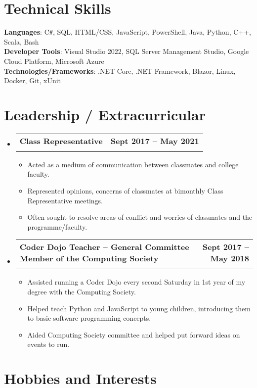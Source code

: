 \documentclass[letterpaper,11pt]{article}
\makeatletter
\newcommand{\resumeItem}[1]{
  \item\small{
    {#1 \vspace{-2pt}}
  }
}
\newcommand{\resumeSubheading}[4]{
  \vspace{-2pt}\item
    \begin{tabular*}{1.0\textwidth}[t]{l@{\extracolsep{\fill}}r}
      \textbf{#1} & \textbf{\small #2} \\
      \textit{\small#3} & \textit{\small #4} \\
    \end{tabular*}\vspace{-7pt}
}
\newcommand{\resumeSubHeadingListStart}{\begin{itemize}[leftmargin=0.0in, label={}]}
\newcommand{\resumeSubHeadingListEnd}{\end{itemize}}
\newcommand{\resumeItemListStart}{\begin{itemize}}
\newcommand{\resumeItemListEnd}{\end{itemize}\vspace{-5pt}}
\makeatother
\begin{document}
%
\section{Technical Skills}
\begin{itemize}[leftmargin=0.15in, label={}]
	\small{\item{
		\textbf{Languages}{: C\verb|#|, SQL, HTML/CSS, JavaScript, PowerShell, Java, Python, C++, Scala, Bash} \\
		\textbf{Developer Tools}{: Visual Studio 2022, SQL Server Management Studio, Google Cloud Platform, Microsoft Azure} \\
		\textbf{Technologies/Frameworks}{: .NET Core, .NET Framework, Blazor, Linux, Docker, Git, xUnit} \\
	}}
\end{itemize}
\vspace{-13pt}


\section{Leadership / Extracurricular}
\resumeSubHeadingListStart
\resumeSubheading{Class Representative}{Sept 2017 -- May 2021}{}{}
\vspace{-15pt}
\resumeItemListStart
\resumeItem{Acted as a medium of communication between classmates and college faculty.}
\resumeItem{Represented opinions, concerns of classmates at bimonthly Class Representative meetings.}
\resumeItem{Often sought to resolve areas of conflict and worries of classmates and the programme/faculty. }
\resumeItemListEnd
\resumeSubHeadingListEnd
\vspace{-15pt}
\resumeSubHeadingListStart
\resumeSubheading{Coder Dojo Teacher -- General Committee Member of the Computing Society}{Sept 2017 -- May 2018}{}{}
\vspace{-15pt}
\resumeItemListStart
\resumeItem{Assisted running a Coder Dojo every second Saturday in 1st year of my degree with the Computing Society.}
\resumeItem{Helped teach Python and JavaScript to young children, introducing them to basic software programming concepts.}
\resumeItem{Aided Computing Society committee and helped put forward ideas on events to run.}
\resumeItemListEnd
       
\resumeSubHeadingListEnd


\section{Hobbies and Interests}
\end{document}
